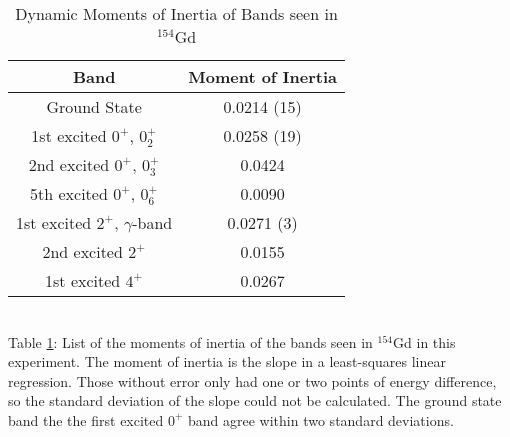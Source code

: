 \begin{table}[!]
    \centering
    \caption{Dynamic Moments of Inertia of Bands seen in $^{154}$Gd}
    \begin{tabular}{c|c}
        \toprule
        Band & Moment of Inertia  \\
        \hline
        Ground State & 0.0214 (15) \\
        1st excited $0^+$, $0^+_2$ & 0.0258 (19) \\
        2nd excited $0^+$, $0^+_3$ & 0.0424 \\
        5th excited $0^+$, $0^+_6$ & 0.0090 \\
        1st excited $2^+$, $\gamma$-band & 0.0271 (3) \\
        2nd excited $2^+$ & 0.0155 \\
        1st excited $4^+$ & 0.0267 \\
        \bottomrule
    \end{tabular}
    \\[2pt]
    \footnotesize
    \label{tab:154_Dynamic}
    Table \ref{tab:154_Dynamic}: List of the moments of inertia of the bands seen in $^{154}$Gd in this experiment. The moment of inertia is the slope in a least-squares linear regression. Those without error only had one or two points of energy difference, so the standard deviation of the slope could not be calculated. The ground state band the the first excited $0^+$ band agree within two standard deviations.
\end{table}